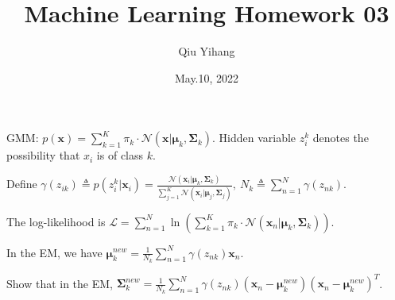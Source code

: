\documentclass{article}
\title{\textbf{Machine Learning Homework 03}}
\author{Qiu Yihang}
\date{May.10, 2022}
\begin{document}
\maketitle

\hspace{-1.9em}
GMM: $p(\mathbf{x})=\sum_{k=1}^{K}\pi_k\cdot\mathcal{N}(\mathbf{x}|\boldsymbol{\mu}_k,\boldsymbol{\Sigma}_k)$. Hidden variable $z_i^k$ denotes the possibility that $x_i$ is of class $k$.

\hspace{1.2em}
Define $\gamma(z_{ik})\triangleq p(z_i^k|\mathbf{x}_i)=\frac{\mathcal{N}(\mathbf{x}_i|\boldsymbol{\mu}_k,\boldsymbol{\Sigma}_k)}{\sum_{j=1}^{K}\mathcal{N}(\mathbf{x}_i|\boldsymbol{\mu}_j,\boldsymbol{\Sigma}_j)},\ N_k \triangleq \sum_{n=1}^N\gamma(z_{nk}).$

\vspace{0.5em}\hspace{1.2em}
The log-likelihood is $\mathcal{L}=\sum_{n=1}^N \ln\left(\sum_{k=1}^K \pi_k\cdot\mathcal{N}(\mathbf{x}_n|\boldsymbol{\mu}_k,\boldsymbol{\Sigma}_k)\right)$.

\vspace{0.3em} \hspace{1.2em}
In the EM, we have $\boldsymbol{\mu}_k^{new}=\frac{1}{N_k}\sum_{n=1}^N\gamma(z_{nk})\mathbf{x}_n$.

\vspace{0.3em} \hspace{-1.8em}
Show that in the EM, $\boldsymbol{\Sigma}_k^{new}=\frac{1}{N_k}\sum_{n=1}^N \gamma(z_{nk})(\mathbf{x}_n-\boldsymbol{\mu}_k^{new})(\mathbf{x}_n-\boldsymbol{\mu}_k^{new})^T$.
\end{document}
